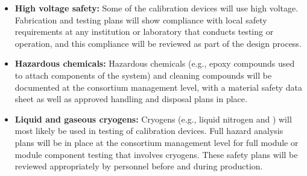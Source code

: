 \begin{itemize}

\item {\bf High voltage safety:} Some of the calibration devices will use high voltage. Fabrication and testing plans will show compliance with local  safety requirements at any institution or laboratory that conducts testing or operation, and this compliance will be reviewed as part of the design process.

\item {\bf Hazardous chemicals:} Hazardous chemicals (e.g., epoxy compounds used to attach components of the system) and cleaning compounds will be documented at the consortium management level, with a material safety data sheet as well as approved handling and disposal plans in place.

\item {\bf Liquid and gaseous cryogens:} Cryogens (e.g., liquid nitrogen and ) will most likely be used in testing of calibration devices. Full hazard analysis plans will be in place at the consortium management level for full module or module component testing that involves cryogens. These safety plans will be reviewed appropriately by   personnel before and during production.

\end{itemize}



